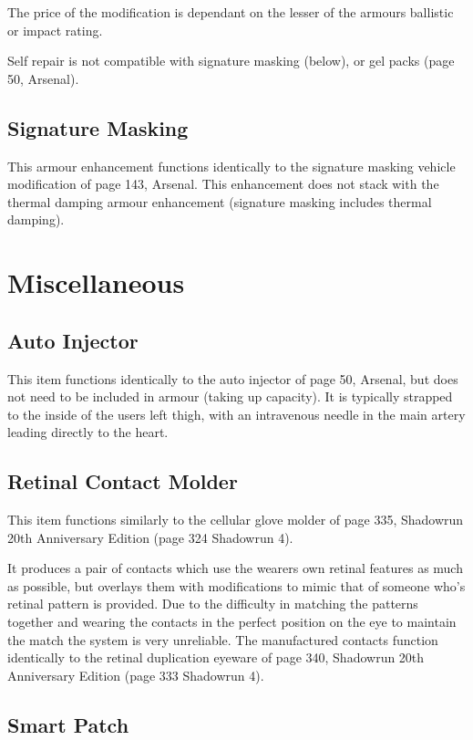 \documentclass{article}
\begin{document}
The price of the modification is dependant on the lesser of the armours ballistic or impact rating.

Self repair is not compatible with signature masking (below), or gel packs (page 50, Arsenal).

\subsection*{Signature Masking}

This armour enhancement functions identically to the signature masking vehicle modification of page 143, Arsenal.  This enhancement does not stack with the thermal damping armour enhancement (signature masking includes thermal damping).

\section*{Miscellaneous}

\subsection*{Auto Injector}

This item functions identically to the auto injector of page 50, Arsenal, but does not need to be included in armour (taking up capacity).  It is typically strapped to the inside of the users left thigh, with an intravenous needle in the main artery leading directly to the heart.

\subsection*{Retinal Contact Molder}

This item functions similarly to the cellular glove molder of page 335, Shadowrun 20th Anniversary Edition (page 324 Shadowrun 4).  

  It produces a pair of contacts which use the wearers own retinal features as much as possible, but overlays them with modifications to mimic that of someone who's retinal pattern is provided.  Due to the difficulty in matching the patterns together and wearing the contacts in the perfect position on the eye to maintain the match the system is very unreliable.  The manufactured contacts function identically to the retinal duplication eyeware of page 340, Shadowrun 20th Anniversary Edition (page 333 Shadowrun 4).

\subsection*{Smart Patch}
\end{document}
